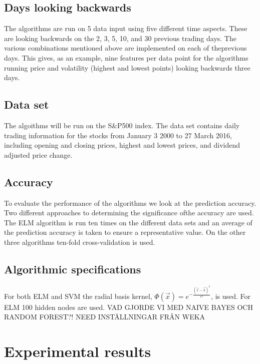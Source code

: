 \documentclass{article}
\begin{document}
\subsection{Days looking backwards}
The algorithms are run on 5 data input using five different time aspects. These are looking backwards on the 2, 3, 5, 10, and 30 previous trading days. The various combinations mentioned above are implemented on each of theprevious days. This gives, as an example, nine features per data point for the algorithms running price and volatility (highest and lowest points) looking backwards three days.

\subsection{Data set}
The algoithms will be run on the S\&P500 index. The data set contains daily trading information for the stocks from January 3 2000 to 27 March 2016, including opening and closing prices, highest and lowest prices, and dividend adjusted price change. 

\subsection{Accuracy} 
To evaluate the performance of the algorithms we look at the prediction accuracy. Two different approaches to determining the significance ofthe accuracy are used. The ELM algorithm is run ten times on the different data sets and an average of the prediction accuracy is taken to ensure a representative value. On the other three algorithms ten-fold cross-validation is used. 

\subsection{Algorithmic specifications}
For both ELM and SVM the radial basis kernel, $\Phi(\vec{x}) = e^{-\frac{(\vec{x} - \vec{k})^2}{r^2}}$, is used. For ELM 100 hidden nodes are used. VAD GJORDE VI MED NAIVE BAYES OCH RANDOM FOREST?! NEED INSTÄLLNINGAR FRÅN WEKA

\newpage

\section{Experimental results}
\end{document}
